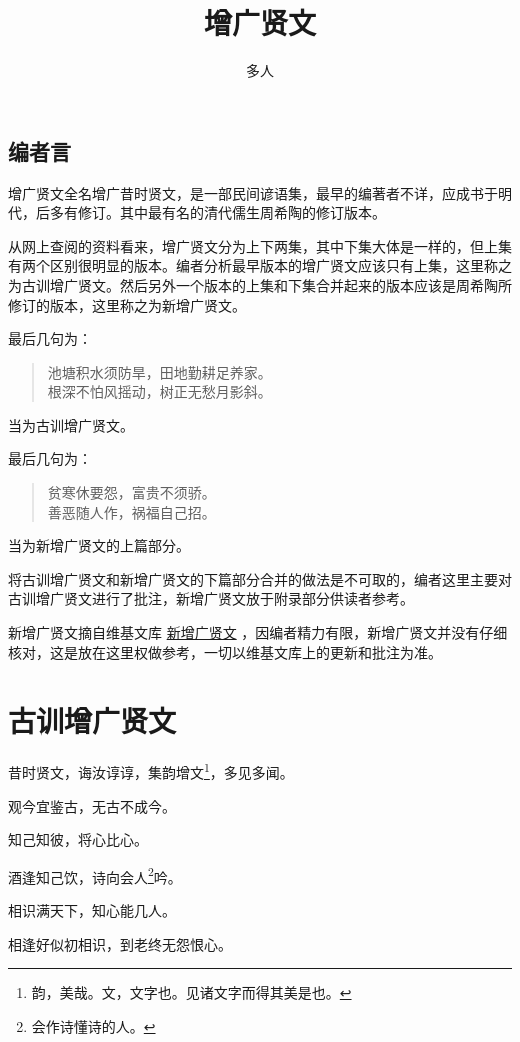 \documentclass[12pt,oneside]{book}
\title{增广贤文}
\author{多人}
\begin{document}



\frontmatter 
{}
\chapter*{编者言}
增广贤文全名增广昔时贤文，是一部民间谚语集，最早的编著者不详，应成书于明代，后多有修订。其中最有名的清代儒生周希陶的修订版本。

从网上查阅的资料看来，增广贤文分为上下两集，其中下集大体是一样的，但上集有两个区别很明显的版本。编者分析最早版本的增广贤文应该只有上集，这里称之为古训增广贤文。然后另外一个版本的上集和下集合并起来的版本应该是周希陶所修订的版本，这里称之为新增广贤文。

最后几句为：
\begin{verse}
池塘积水须防旱，田地勤耕足养家。\\
根深不怕风摇动，树正无愁月影斜。
\end{verse}

当为古训增广贤文。

最后几句为：
\begin{verse}
贫寒休要怨，富贵不须骄。\\
善恶随人作，祸福自己招。
\end{verse}

当为新增广贤文的上篇部分。

将古训增广贤文和新增广贤文的下篇部分合并的做法是不可取的，编者这里主要对古训增广贤文进行了批注，新增广贤文放于附录部分供读者参考。

新增广贤文摘自维基文库 \href{https://zh.m.wikisource.org/zh-hans/%E5%A2%9E%E5%BB%A3%E8%B3%A2%E6%96%87}{新增广贤文} ，因编者精力有限，新增广贤文并没有仔细核对，这是放在这里权做参考，一切以维基文库上的更新和批注为准。%


\setcounter{tocdepth}{2}    
\tableofcontents


\mainmatter
\part{古训增广贤文}
昔时贤文，诲汝谆谆，集韵增文\footnote{韵，美哉。文，文字也。见诸文字而得其美是也。}，多见多闻。

观今宜鉴古，无古不成今。

知己知彼，将心比心。

酒逢知己饮，诗向会人\footnote{会作诗懂诗的人。}吟。

相识满天下，知心能几人。

相逢好似初相识，到老终无怨恨心。
\end{document}
